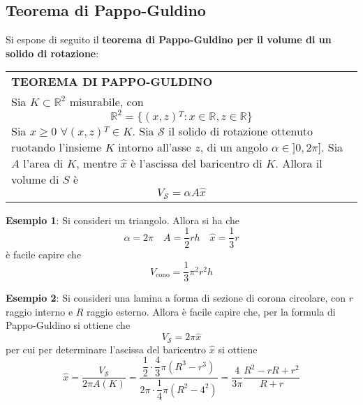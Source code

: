 \documentclass[a4paper]{extarticle}
\renewcommand\arraystretch{}
\begin{document}
\vspace{1em}
\noindent
\subsection{Teorema di Pappo-Guldino}
Si espone di seguito il \textbf{teorema di Pappo-Guldino per il volume di un solido di rotazione}:

\vspace{1em}
\setlength{\tabcolsep}{14pt}
\renewcommand{\arraystretch}{2}
\noindent
\begin{tabularx}{\textwidth}{@{}|P|@{}}
    \hline
    {\textbf{TEOREMA DI PAPPO-GULDINO}}\\
    \parbox{\linewidth}{Sia $K \subset \mathbb{R}^2$ misurabile, con
    \[\mathbb{R}^2 = \{(x,z){^T} : x \in \mathbb{R}, z \in \mathbb{R}\}\]
    Sia $x \geq 0$ $\forall (x,z){^T} \in K$. Sia $\mathcal{S}$ il solido di rotazione ottenuto ruotando l'insieme $K$ intorno all'asse $z$, di un angolo $\alpha \in ]0,2\pi]$. Sia $A$ l'area di $K$, mentre $\hat x$ è l'ascissa del baricentro di $K$. Allora il volume di $S$ è
    \[\boxed{V_\mathcal{S} = \alpha A \hat x}\]
    \vspace{-3mm}}\\
    \hline
\end{tabularx}

\vspace{2em}
\noindent
\textbf{Esempio 1}: Si consideri un triangolo. Allora si ha che
\[\alpha=2 \pi \hspace{1em} A= \dfrac{1}{2} r h \hspace{1em} \hat x = \dfrac{1}{3} r\]
è facile capire che
\[V_\text{cono}=\dfrac{1}{3} \pi^2 r^2 h\]

\vspace{2em}
\noindent
\textbf{Esempio 2}: Si consideri una lamina a forma di sezione di corona circolare, con $r$ raggio interno e $R$ raggio esterno. Allora è facile capire che, per la formula di Pappo-Guldino si ottiene che
\[V_\mathcal{S} = 2 \pi \hat x\]
per cui per determinare l'ascissa del baricentro $\hat x$ si ottiene
\[\hat x = \dfrac{V_\mathcal{S}}{2 \pi A(K)} = \dfrac{\dfrac{1}{2} \cdot \dfrac{4}{3}\pi (R^3 - r^3)}{2 \pi \cdot \dfrac{1}{4} \pi (R^2-4^2)} = \dfrac{4}{3 \pi} \dfrac{R^2 - rR + r^2}{R+r}\]
\end{document}

